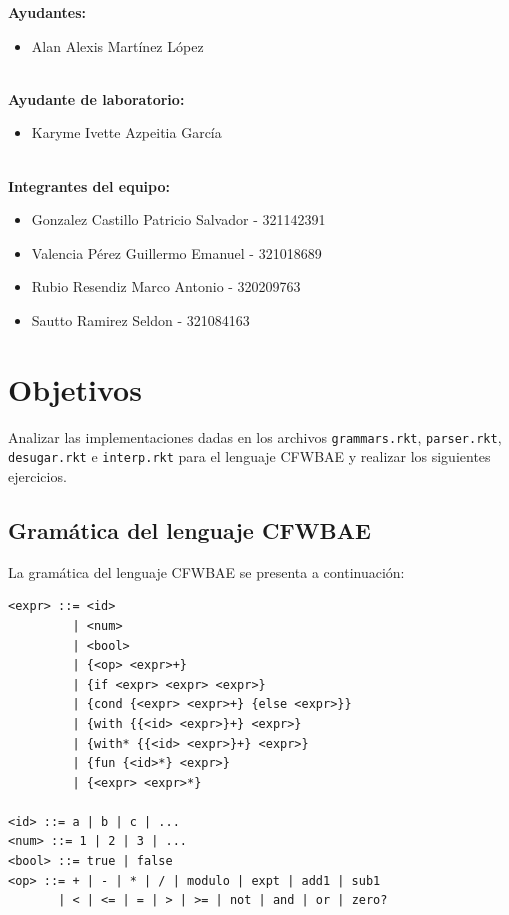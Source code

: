 \documentclass[12pt,letterpaper]{article}
\begin{document}
\begin{titlepage}
\textbf{Ayudantes:}
\begin{itemize}
    \item Alan Alexis Mart\'inez L\'opez \\\\
\end{itemize}

\textbf{Ayudante de laboratorio:}
\begin{itemize}
    \item Karyme Ivette Azpeitia Garc\'ia \\\\
\end{itemize}

\textbf{Integrantes del equipo:}
\begin{itemize}
    \item Gonzalez Castillo Patricio Salvador - 321142391
    \item Valencia Pérez Guillermo Emanuel - 321018689
    \item Rubio Resendiz Marco Antonio - 320209763
    \item Sautto Ramirez Seldon - 321084163
\end{itemize}

\end{titlepage}

\section{Objetivos}

Analizar las implementaciones dadas en los archivos \texttt{grammars.rkt}, \texttt{parser.rkt}, \texttt{desugar.rkt} e \texttt{interp.rkt} para el lenguaje CFWBAE y realizar los siguientes ejercicios.

\subsection{Gramática del lenguaje CFWBAE}

La gramática del lenguaje CFWBAE se presenta a continuación:

\begin{lstlisting}
<expr> ::= <id>
         | <num>
         | <bool>
         | {<op> <expr>+}
         | {if <expr> <expr> <expr>}
         | {cond {<expr> <expr>+} {else <expr>}}
         | {with {{<id> <expr>}+} <expr>}
         | {with* {{<id> <expr>}+} <expr>}
         | {fun {<id>*} <expr>}
         | {<expr> <expr>*}

<id> ::= a | b | c | ...
<num> ::= 1 | 2 | 3 | ...
<bool> ::= true | false
<op> ::= + | - | * | / | modulo | expt | add1 | sub1
       | < | <= | = | > | >= | not | and | or | zero?
\end{lstlisting}
\end{document}
